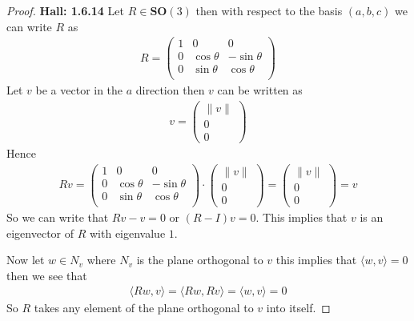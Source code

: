 \documentclass[11pt]{article}
\newcommand{\inprd}[1]{\langle{#1}\rangle}
\theoremstyle{definition}
\begin{document}
\cleardoublepage
\begin{proof}{\textbf{Hall: 1.6.14}}
Let $R \in \bm{SO}(3)$ then with respect to the basis $(a, b, c)$ we can
write $R$ as 
\begin{align*}
    R = \begin{pmatrix}
        1 & 0 & 0\\
        0 & \cos\theta & -\sin\theta\\
        0 & \sin\theta & \cos\theta\\
    \end{pmatrix}
\end{align*}
Let $v$ be a vector in the $a$ direction then $v$ can be written as
\begin{align*}
    v = \begin{pmatrix}\|v\| \\ 0 \\ 0\end{pmatrix}
\end{align*}
Hence
\begin{align*}
    Rv = \begin{pmatrix}
        1 & 0 & 0\\
        0 & \cos\theta & -\sin\theta\\
        0 & \sin\theta & \cos\theta\\
    \end{pmatrix} \cdot \begin{pmatrix}\|v\| \\ 0 \\ 0\end{pmatrix}
    = \begin{pmatrix}
        \|v\| \\ 0 \\ 0 
    \end{pmatrix} = v
\end{align*}
So we can write that $Rv - v = 0$ or $(R - I)v = 0$. This implies that $v$
is an eigenvector of $R$ with eigenvalue $1$.

Now let $w \in N_v$ where $N_v$ is the plane orthogonal to $v$ this implies
that $\inprd{w,v} = 0$ then we see that
\begin{align*}
    \inprd{Rw, v} = \inprd{Rw, Rv} = \inprd{w, v} = 0
\end{align*}
So $R$ takes any element of the plane orthogonal to $v$ into itself.


\end{proof}
\end{document}
